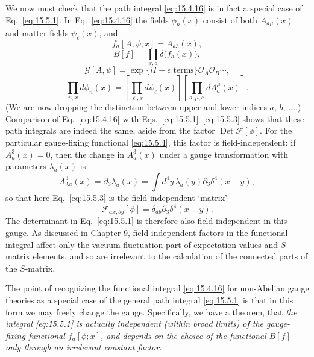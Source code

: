 We now must check that the path integral \eqref{eq:15.4.16} is in fact a
special case of Eq.~\eqref{eq:15.5.1}. In Eq.~\eqref{eq:15.4.16} the fields
$\phi_n(x)$ consist of both $A_{a\mu}(x)$ and matter fields $\psi_\ell(x)$,
and
\begin{equation}
  f_a[A,\psi;x]=A_{a3}(x),
  \tag{15.5.4}\label{eq:15.5.4}
\end{equation}
\begin{equation}
  B[f]=\prod_{x,a}\delta\bigl(f_a(x)\bigr),
  \tag{15.5.5}\label{eq:15.5.5}
\end{equation}
\begin{equation}
  \mathcal G[A,\psi]=\exp\{iI+\epsilon\text{ terms}\}
  \mathcal O_A\mathcal O_B\cdots,
  \tag{15.5.6}\label{eq:15.5.6}
\end{equation}
\begin{equation}
  \prod_{n,x}d\phi_n(x)
  =\left[\prod_{\ell,x}d\psi_\ell(x)\right]
  \left[\prod_{a,\mu,x}dA_a^\mu(x)\right].
  \tag{15.5.7}\label{eq:15.5.7}
\end{equation}
(We are now dropping the distinction between upper and lower indices
$a$, $b$, $\ldots$.) Comparison of Eq.~\eqref{eq:15.4.16} with
Eqs.~\eqref{eq:15.5.1}--\eqref{eq:15.5.3} shows that these path integrals are
indeed the same, aside from the factor $\operatorname{Det}\mathcal F[\phi]$.
For the particular gauge-fixing functional \eqref{eq:15.5.4}, this factor is
field-independent: if $A_a^3(x)=0$, then the change in
$A_a^3(x)$ under a gauge transformation with parameters
$\lambda_a(x)$ is
\begin{equation*}
  A_{\lambda a}^3(x)=\partial_3\lambda_a(x)
  =\int d^4y\,\lambda_a(y)\partial_3\delta^4(x-y),
\end{equation*}
so that here Eq.~\eqref{eq:15.5.3} is the field-independent `matrix'
\begin{equation*}
  \mathcal F_{a x,b y}[\phi]
  =\delta_{ab}\partial_3\delta^4(x-y).
\end{equation*}
The determinant in Eq.~\eqref{eq:15.5.1} is therefore also field-independent
in this gauge. As discussed in Chapter 9, field-independent factors in the
functional integral affect only the vacuum-fluctuation part of expectation
values and $S$-matrix elements, and so are irrelevant to the calculation of
the connected parts of the $S$-matrix.

The point of recognizing the functional integral \eqref{eq:15.4.16} for
non-Abelian gauge theories as a special case of the general path integral
\eqref{eq:15.5.1} is that in this form we may freely change the gauge.
Specifically, we have a theorem, that \emph{the integral \eqref{eq:15.5.1} is
actually independent (within broad limits) of the gauge-fixing functional
$f_a[\phi;x]$, and depends on the choice of the functional $B[f]$ only
through an irrelevant constant factor.}

